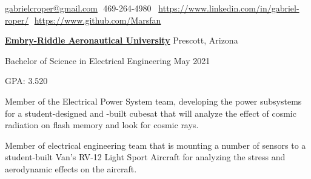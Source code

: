 \documentclass[letterpaper,ddMMMyyyy,nonstopmode]{simpleresumecv}
\makeatletter
\newcommand{\CVAuthor}{Gabriel Roper}
\newcommand{\LinkedInPage}{https://www.linkedin.com/in/gabriel-roper/}
\newcommand{\GithubPage}{https://www.github.com/Marsfan}
\newcommand{\emailAddress}{gabrielcroper@gmail.com}
\newcommand{\streetAddress}{}
\newcommand{\phoneNumber}{469-264-4980}
\newcommand{\GPA}{3.520}
\makeatother
\begin{document}
	\Title{\CVAuthor}

	\begin{SubTitle}
		{\streetAddress}
		\par
		\href{mailto:\emailAddress}{\emailAddress}
		\BulletSymbol
		\,\,\phoneNumber\,
		\BulletSymbol
		\,\,\href{\LinkedInPage}{\url{\LinkedInPage}}
		\BulletSymbol
		\,\,\href{\GithubPage}{\url{\GithubPage}}
	\end{SubTitle}

	\begin{Body}



            \Entry
            \href{https://prescott.erau.edu}{\textbf{Embry-Riddle Aeronautical University}}
            \hfill Prescott, Arizona

            Bachelor of Science in Electrical Engineering %
            \hfill May 2021

            \hfill GPA: \GPA



                {Member of the Electrical Power System team, developing the
                    power subsystems for a student-designed and -built
                    cubesat that will analyze the effect of cosmic radiation on
                    flash memory and look for cosmic rays.}

                {Member of electrical engineering team that is mounting a number of sensors
                    to a student-built Van's RV-12 Light Sport Aircraft for analyzing the
                    stress and aerodynamic effects on the aircraft.}



\end{Body}
\end{document}
